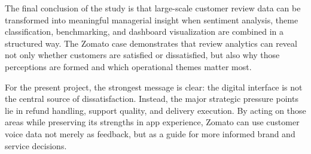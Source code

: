 The final conclusion of the study is that large-scale customer review data can be transformed into meaningful managerial insight when sentiment analysis, theme classification, benchmarking, and dashboard visualization are combined in a structured way. The Zomato case demonstrates that review analytics can reveal not only whether customers are satisfied or dissatisfied, but also why those perceptions are formed and which operational themes matter most.

For the present project, the strongest message is clear: the digital interface is not the central source of dissatisfaction. Instead, the major strategic pressure points lie in refund handling, support quality, and delivery execution. By acting on those areas while preserving its strengths in app experience, Zomato can use customer voice data not merely as feedback, but as a guide for more informed brand and service decisions.
